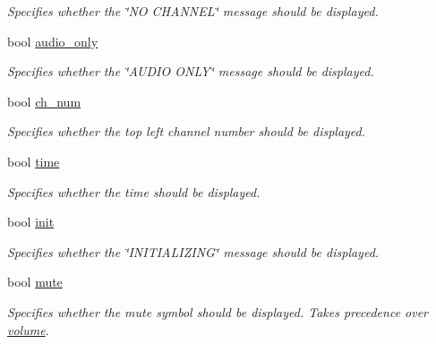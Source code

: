 \begin{DoxyCompactItemize}
\begin{DoxyCompactList}\small\item\em Specifies whether the \char`\"{}\+N\+O C\+H\+A\+N\+N\+E\+L\char`\"{} message should be displayed. \end{DoxyCompactList}\item 
bool \hyperlink{structgraphics__flags_aad6f429cd9f715a69bb14e2abf6db718}{audio\+\_\+only}\hypertarget{structgraphics__flags_aad6f429cd9f715a69bb14e2abf6db718}{}\label{structgraphics__flags_aad6f429cd9f715a69bb14e2abf6db718}

\begin{DoxyCompactList}\small\item\em Specifies whether the \char`\"{}\+A\+U\+D\+I\+O O\+N\+L\+Y\char`\"{} message should be displayed. \end{DoxyCompactList}\item 
bool \hyperlink{structgraphics__flags_a9def1d8fb73e0175f0d2a27331732f19}{ch\+\_\+num}\hypertarget{structgraphics__flags_a9def1d8fb73e0175f0d2a27331732f19}{}\label{structgraphics__flags_a9def1d8fb73e0175f0d2a27331732f19}

\begin{DoxyCompactList}\small\item\em Specifies whether the top left channel number should be displayed. \end{DoxyCompactList}\item 
bool \hyperlink{structgraphics__flags_acda6aca3d8288e5b1c0d2648957698a3}{time}\hypertarget{structgraphics__flags_acda6aca3d8288e5b1c0d2648957698a3}{}\label{structgraphics__flags_acda6aca3d8288e5b1c0d2648957698a3}

\begin{DoxyCompactList}\small\item\em Specifies whether the time should be displayed. \end{DoxyCompactList}\item 
bool \hyperlink{structgraphics__flags_a72ec7ac8b062a1a6dde4662b4af31208}{init}\hypertarget{structgraphics__flags_a72ec7ac8b062a1a6dde4662b4af31208}{}\label{structgraphics__flags_a72ec7ac8b062a1a6dde4662b4af31208}

\begin{DoxyCompactList}\small\item\em Specifies whether the \char`\"{}\+I\+N\+I\+T\+I\+A\+L\+I\+Z\+I\+N\+G\char`\"{} message should be displayed. \end{DoxyCompactList}\item 
bool \hyperlink{structgraphics__flags_a3309b3b318980c66dc349e26707f039c}{mute}\hypertarget{structgraphics__flags_a3309b3b318980c66dc349e26707f039c}{}\label{structgraphics__flags_a3309b3b318980c66dc349e26707f039c}

\begin{DoxyCompactList}\small\item\em Specifies whether the mute symbol should be displayed. Takes precedence over \hyperlink{structgraphics__flags_aa00a1018a3820d20a55a36da5b21e966}{volume}. \end{DoxyCompactList}\end{DoxyCompactItemize}


